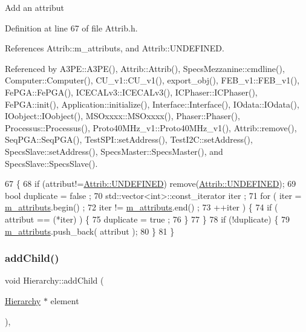 Add an attribut 

Definition at line 67 of file Attrib.\+h.



References Attrib\+::m\+\_\+attributs, and Attrib\+::\+U\+N\+D\+E\+F\+I\+N\+ED.



Referenced by A3\+P\+E\+::\+A3\+P\+E(), Attrib\+::\+Attrib(), Specs\+Mezzanine\+::cmdline(), Computer\+::\+Computer(), C\+U\+\_\+v1\+::\+C\+U\+\_\+v1(), export\+\_\+obj(), F\+E\+B\+\_\+v1\+::\+F\+E\+B\+\_\+v1(), Fe\+P\+G\+A\+::\+Fe\+P\+G\+A(), I\+C\+E\+C\+A\+Lv3\+::\+I\+C\+E\+C\+A\+Lv3(), I\+C\+Phaser\+::\+I\+C\+Phaser(), Fe\+P\+G\+A\+::init(), Application\+::initialize(), Interface\+::\+Interface(), I\+Odata\+::\+I\+Odata(), I\+Oobject\+::\+I\+Oobject(), M\+S\+Oxxxx\+::\+M\+S\+Oxxxx(), Phaser\+::\+Phaser(), Processus\+::\+Processus(), Proto40\+M\+Hz\+\_\+v1\+::\+Proto40\+M\+Hz\+\_\+v1(), Attrib\+::remove(), Seq\+P\+G\+A\+::\+Seq\+P\+G\+A(), Test\+S\+P\+I\+::set\+Address(), Test\+I2\+C\+::set\+Address(), Specs\+Slave\+::set\+Address(), Specs\+Master\+::\+Specs\+Master(), and Specs\+Slave\+::\+Specs\+Slave().


\begin{DoxyCode}
67                             \{
68     \textcolor{keywordflow}{if} (attribut!=\hyperlink{classAttrib_a69e171d7cc6417835a5a306d3c764235a3a8da2ab97dda18aebab196fe4100531}{Attrib::UNDEFINED}) \textcolor{keyword}{remove}(\hyperlink{classAttrib_a69e171d7cc6417835a5a306d3c764235a3a8da2ab97dda18aebab196fe4100531}{Attrib::UNDEFINED});
69     \textcolor{keywordtype}{bool} duplicate = false ;
70     std::vector<int>::const\_iterator iter ;
71     \textcolor{keywordflow}{for} ( iter  = \hyperlink{classAttrib_ac4bd58a0cc6b38a3b711d609a3d3aacc}{m\_attributs}.begin() ;
72           iter != \hyperlink{classAttrib_ac4bd58a0cc6b38a3b711d609a3d3aacc}{m\_attributs}.end()   ;
73           ++iter ) \{
74       \textcolor{keywordflow}{if} ( attribut == (*iter) ) \{
75         duplicate = true ;
76       \}
77     \}
78     \textcolor{keywordflow}{if} (!duplicate) \{
79       \hyperlink{classAttrib_ac4bd58a0cc6b38a3b711d609a3d3aacc}{m\_attributs}.push\_back( attribut );
80     \}
81   \}
\end{DoxyCode}
\mbox{\label{classHierarchy_ad677774ff38fcb257c04a3a10d471fac}} 
\subsubsection{\texorpdfstring{add\+Child()}{addChild()}}
{\footnotesize\ttfamily void Hierarchy\+::add\+Child (\begin{DoxyParamCaption}\item[{\hyperlink{classHierarchy}{Hierarchy} $\ast$}]{element }\end{DoxyParamCaption})\hspace{0.3cm}{\ttfamily [virtual]}, {\ttfamily [inherited]}}



